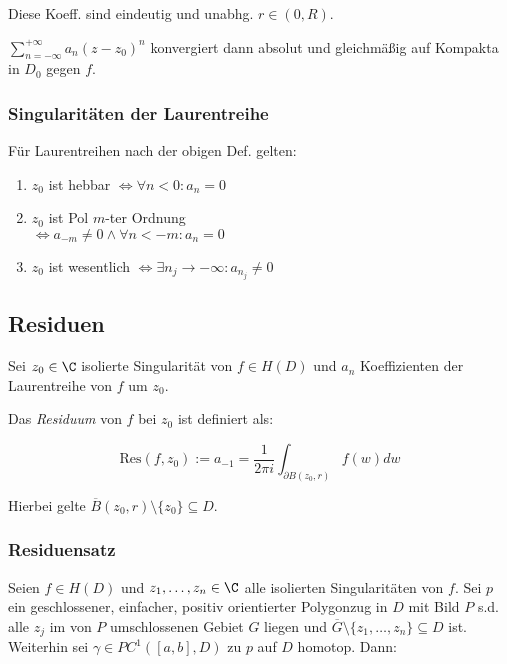 Diese Koeff. sind eindeutig und unabhg. \(r \in (0,R)\).

\spacing

\(\sum_{n=-\infty}^{+\infty} a_n(z-z_0)^n\) konvergiert dann absolut und gleichmäßig auf Kompakta in \(D_0\) gegen \(f\).

\subsubsection*{Singularitäten der Laurentreihe}

Für Laurentreihen nach der obigen Def. gelten:

\begin{enumerate}[label=(\alph*)]
	\item \(z_0\) ist hebbar \(\iff \forall n < 0 : a_n = 0\)
	\item \(z_0\) ist Pol \(m\)-ter Ordnung \\ \(\iff a_{-m} \neq 0 \land \forall n < -m : a_n = 0\)
	\item \(z_0\) ist wesentlich \(\iff \exists n_j \to -\infty : a_{n_j} \neq 0\)
\end{enumerate}

\subsection*{Residuen}

Sei \(z_0 \in \C\) isolierte Singularität von \(f \in H(D)\) und \(a_n\) Koeffizienten der Laurentreihe von \(f\) um \(z_0\).

Das \emph{Residuum} von \(f\) bei \(z_0\) ist definiert als:

\[ \text{Res}(f,z_0) := a_{-1} = \frac{1}{2\pi i} \int_{\partial B(z_0,r)} f(w) dw \]

Hierbei gelte \(\overline B(z_0,r) \setminus \{z_0\} \subseteq D\).

\subsubsection*{Residuensatz}

Seien \(f \in H(D)\) und \(z_1, \dots, z_n \in \C\) alle isolierten Singularitäten von \(f\). Sei \(p\) ein geschlossener, einfacher, positiv orientierter Polygonzug in \(D\) mit Bild \(P\) s.d. alle \(z_j\) im von \(P\) umschlossenen Gebiet \(G\) liegen und \(\overline G \setminus \{z_1,\dots,z_n\} \subseteq D\) ist. Weiterhin sei \(\gamma \in PC^1([a,b],D)\) zu \(p\) auf \(D\) homotop. Dann:

